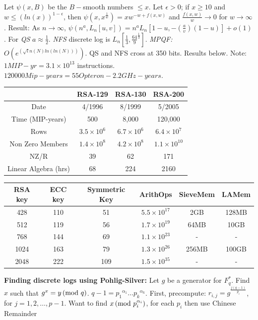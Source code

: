 Let $\psi(x,B)$ be the $B-$smooth
numbers $\le x$.  Let $\epsilon >0$; if $x \ge 10$ and $w \le (ln(x))^{1-\epsilon}$,
then $\psi(x, x^{\frac 1 w}) = x w^{-w+f(x,w)}$ and ${\frac {f(x,w)} w} \rightarrow 0$
for $w \rightarrow \infty$.  Result: As $n \rightarrow \infty$,
$\psi(n^a , L_n[u,v]) = n^a L_n[1-u, -({\frac a v})(1-u)]+o(1)$. 
For \emph{QS} $a \approx {\frac 1 2}$.
\emph{NFS} discrete log is $L_n[{\frac 1 3}, {\frac {64} 9}^{\frac 1 3}]$.
\emph{MPQF:} $O(e^{({\sqrt ln(N) ln(ln(N))})})$.  QS and NFS cross at
350 bits.  Results below.  Note: $1 MIP-yr= 3.1 \times 10^{13}$ instructions.  
$120000 Mip-years= 55 Opteron-2.2GHz-years$.
\begin{center}
\begin{tabular} {|c|ccc|}
\hline
 & RSA-129 & RSA-130 & RSA-200 \\
\hline
Date &  4/1996 & 8/1999 & 5/2005 \\
Time (MIP-years) & 500 & 8,000 & 120,000 \\
Rows & $3.5 \times 10^6$ & $6.7 \times 10^6$ & $6.4 \times 10^7$\\
Non Zero Members & $1.4 \times 10^8$ & $4.2 \times 10^8$ & $1.1 \times 10^{10}$\\
NZ/R & 39 & 62 & 171 \\
Linear Algebra (hrs) & 68 & 224 & 2160\\
\hline
\end{tabular}
\end{center}
\begin{center}
\begin{tabular} {|cccccc|}
\hline
RSA key & ECC key & Symmetric Key & ArithOps & SieveMem & LAMem\\
\hline
428 & 110 & 51 & $5.5 \times 10^{17}$ & 2GB & 128MB\\
512 & 119 & 56  & $1.7 \times 10^{19}$ & 64MB & 10GB \\
768 & 144 & 69 & $1.1 \times 10^{23}$ & - & - \\
1024 & 163 & 79 & $1.3 \times 10^{26}$ & 256MB & 100GB\\
2048 & 222 & 109 & $1.5 \times 10^{35}$ & - & -\\
\hline
\end{tabular}
\end{center}
{\bf Finding discrete logs using
Pohlig-Silver:}  Let $g$ be a generator for $F_q^*$.
Find $x$ such that $g^x = y \thinspace \textnormal{(mod } q \textnormal{)}$.
$q-1 = {p_1}^{\alpha_1} \ldots {p_k}^{\alpha_k}$.
First, precompute:
$r_{i,j}= g^{\frac {j(q-1)} {p_i}}$, for $j= 1,2, \ldots , p-1$.
Want to find $x \thinspace \textnormal{(mod } p_i^{\alpha_i} \textnormal{)}$, for each $p_i$ then use Chinese Remainder
